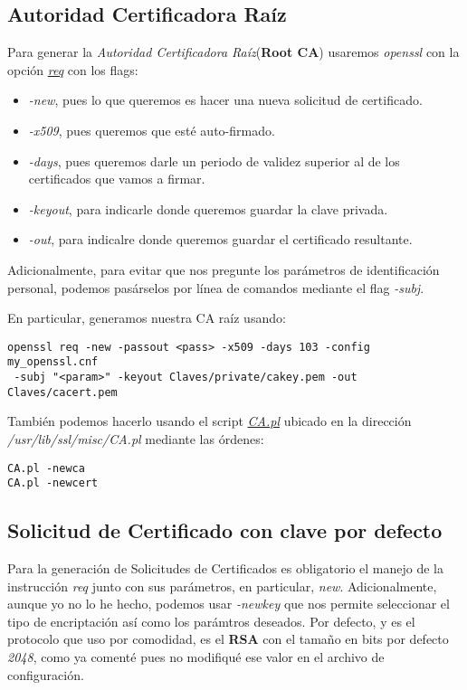 \documentclass[a4paper, 11pt]{article}
\begin{document}
	\subsection{Autoridad Certificadora Raíz}
		Para generar la \textit{Autoridad Certificadora Raíz}(\textbf{Root CA}) usaremos \textit{openssl} con la opción
		\href{https://www.openssl.org/docs/man1.0.2/apps/req.html}{\textit{req}} con los flags:
		\begin{itemize}
			\item \textit{-new}, pues lo que queremos es hacer una nueva solicitud de certificado.
			\item \textit{-x509}, pues queremos que esté auto-firmado.
			\item \textit{-days}, pues queremos darle un periodo de validez superior al de los certificados que vamos a firmar.
			\item \textit{-keyout}, para indicarle donde queremos guardar la clave privada.
			\item \textit{-out}, para indicalre donde queremos guardar el certificado resultante.
		\end{itemize}
		
		Adicionalmente, para evitar que nos pregunte los parámetros de identificación personal, podemos pasárselos por línea de
		comandos mediante el flag \textit{-subj}.
		
		En particular, generamos nuestra CA raíz usando:\\
		\begin{small}
			\verb|openssl req -new -passout <pass> -x509 -days 103 -config my_openssl.cnf|\\
			\verb| -subj "<param>" -keyout Claves/private/cakey.pem -out Claves/cacert.pem|\\
		\end{small}
		
		También podemos hacerlo usando el script \href{https://www.openssl.org/docs/man1.0.2/apps/CA.pl.html}{\textit{CA.pl}}
		ubicado en la dirección \textit{/usr/lib/ssl/misc/CA.pl} mediante las órdenes:\\
		\begin{small}
			\verb|CA.pl -newca|\\
			\verb|CA.pl -newcert|\\
		\end{small}
	
	\subsection{Solicitud de Certificado con clave por defecto}
		Para la generación de Solicitudes de Certificados es obligatorio el manejo de la instrucción \textit{req} junto con
		sus parámetros, en particular, \textit{new}. Adicionalmente, aunque yo no lo he hecho, podemos usar \textit{-newkey}
		que nos permite seleccionar el tipo de encriptación así como los parámtros deseados. Por defecto, y es el protocolo
		que uso por comodidad, es el \textbf{RSA} con el tamaño en bits por defecto \textit{2048}, como ya comenté pues no
		modifiqué ese valor en el archivo de configuración.
		
\end{document}
